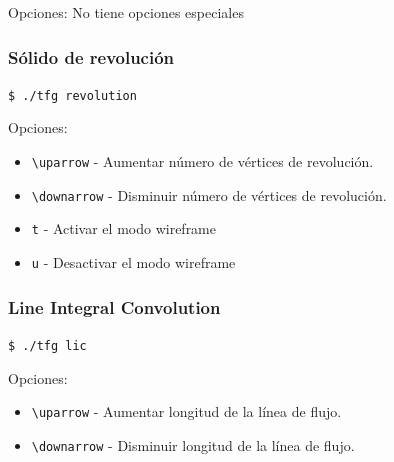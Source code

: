Opciones: No tiene opciones especiales

\subsubsection{Sólido de revolución}

\verb|$ ./tfg revolution|

Opciones:

\begin{itemize}
		\item \verb|\uparrow| - Aumentar número de vértices de revolución.
		\item \verb|\downarrow| - Disminuir número de vértices de revolución.
		\item \verb|t| - Activar el modo wireframe
		\item \verb|u| - Desactivar el modo wireframe
\end{itemize}

\subsubsection{Line Integral Convolution}

\verb|$ ./tfg lic|

Opciones:

\begin{itemize}
		\item \verb|\uparrow| - Aumentar longitud de la línea de flujo.
		\item \verb|\downarrow| - Disminuir longitud de la línea de flujo.
\end{itemize}
